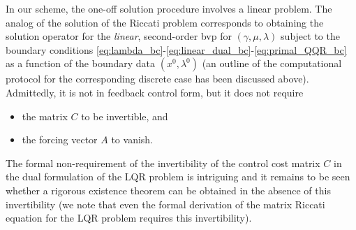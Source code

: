 \documentclass[11pt]{article}
\begin{document}
In our scheme, the one-off solution procedure involves a linear problem. The analog of the solution of the Riccati problem corresponds to obtaining the solution operator for the \emph{linear}, second-order bvp for $(\gamma, \mu, \lambda)$ subject to the boundary conditions \eqref{eq:lambda_bc}-\eqref{eq:linear_dual_bc}-\eqref{eq:primal_QQR_bc} as a function of the boundary data $(x^0, \lambda^0)$ (an outline of the computational protocol for the corresponding discrete case has been discussed above). Admittedly, it is not in feedback control form, but it does not require 
\begin{itemize}
    \item the matrix $C$ to be invertible, and 
    \item the forcing vector $A$ to vanish. 
\end{itemize}

The formal non-requirement of the invertibility of the control cost matrix $C$ in the dual formulation of the LQR problem is intriguing and it remains to be seen whether a rigorous existence theorem can be obtained in the absence of this invertibility (we note that even the formal derivation of the matrix Riccati equation for the LQR problem requires this invertibility).
\end{document}
